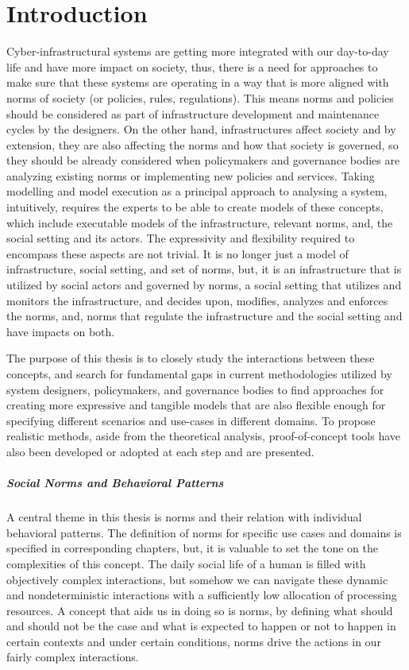 \chapter{Introduction}
Cyber-infrastructural systems are getting more integrated with our day-to-day life and have more impact on society, thus, there is a need for approaches to make sure that these systems are operating in a way that is more aligned with norms of society (or policies, rules, regulations). This means norms and policies should be considered as part of infrastructure development and maintenance cycles by the designers. On the other hand, infrastructures affect society and by extension, they are also affecting the norms and how that society is governed, so they should be already considered when policymakers and governance bodies are analyzing existing norms or implementing new policies and services. Taking modelling and model execution as a principal approach to analysing a system, intuitively, requires the experts to be able to create models of these concepts, which include executable models of the infrastructure, relevant norms, and, the social setting and its actors. The expressivity and flexibility required to encompass these aspects are not trivial. It is no longer just a model of infrastructure, social setting, and set of norms, but, it is an infrastructure that is utilized by social actors and governed by norms, a social setting that utilizes and monitors the infrastructure, and decides upon, modifies, analyzes and enforces the norms, and, norms that regulate the infrastructure and the social setting and have impacts on both.


The purpose of this thesis is to closely study the interactions between these concepts, and search for fundamental gaps in current methodologies utilized by system designers, policymakers, and governance bodies to find approaches for creating more expressive and tangible models that are also flexible enough for specifying different scenarios and use-cases in different domains. To propose realistic methods, aside from the theoretical analysis, proof-of-concept tools have also been developed or adopted at each step and are presented.


\paragraph{Social Norms and Behavioral Patterns}
A central theme in this thesis is norms and their relation with individual behavioral patterns. The definition of norms for specific use cases and domains is specified in corresponding chapters, but, it is valuable to set the tone on the complexities of this concept. The daily social life of a human is filled with objectively complex interactions, but somehow we can navigate these dynamic and nondeterministic interactions with a sufficiently low allocation of processing resources. A concept that aids us in doing so is norms, by defining what should and should not be the case and what is expected to happen or not to happen in certain contexts and under certain conditions, norms drive the actions in our fairly complex interactions. 



